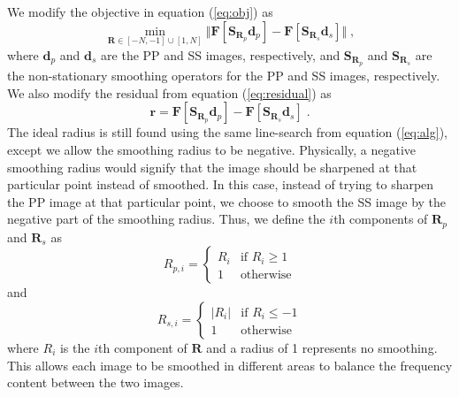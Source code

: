 
        We modify the objective in equation (\ref{eq:obj}) as
            \begin{equation}
                \label{eq:obj2}
                \min_{\mathbf{R} \in [-N, -1] \cup [1, N]} \Big \Vert \mathbf{F}[
                \mathbf{S}_{\mathbf{R}_p} \mathbf{d}_{p} ] - \mathbf{F}[
                \mathbf{S}_{\mathbf{R}_s}\mathbf{d}_{s}] \Big \Vert\;, 
            \end{equation}
        where $\mathbf{d}_p$ and $\mathbf{d}_s$ are the PP and SS images, respectively, and $\mathbf{S}_{\mathbf{R}_p}$ and $\mathbf{S}_{\mathbf{R}_s}$ are the non-stationary smoothing operators for the PP and SS images, respectively.
        We also modify the residual from equation (\ref{eq:residual}) as
            \begin{equation}
                \label{eq:residual2}
                \mathbf{r} = \mathbf{F}[\mathbf{S}_{\mathbf{R}_{p}}\mathbf{d}_p] -
                \textbf{F}[\mathbf{S}_{\mathbf{R}_s}\mathbf{d}_s]\;.
            \end{equation}
        The ideal radius is still found using the same line-search from equation (\ref{eq:alg}), except we allow the smoothing radius to be negative. 
        Physically, a negative smoothing radius would signify that the image should be sharpened at that particular point instead of smoothed. 
        In this case, instead of trying to sharpen the PP image at that particular point, we choose to smooth the SS image by the negative part of the smoothing radius. 
        Thus, we define the $i$th components of $\mathbf{R}_p$ and $\mathbf{R}_s$ as 
        \begin{equation}
                R_{p,i} = \begin{cases} R_{i} &\mbox{if } R_{i} \ge 1 \\
        1 & \mbox{otherwise} \end{cases} 
        \end{equation}
        and
        \begin{equation}
                R_{s,i} = \begin{cases} |R_{i}| &\mbox{if } R_{i} \le -1 \\
        1 & \mbox{otherwise} \end{cases} 
        \end{equation}
        where $R_i$ is the $i$th component of $\mathbf{R}$ and a radius of 1 represents no smoothing. 
        This allows each image to be smoothed in different areas to balance the frequency content between the two images.

